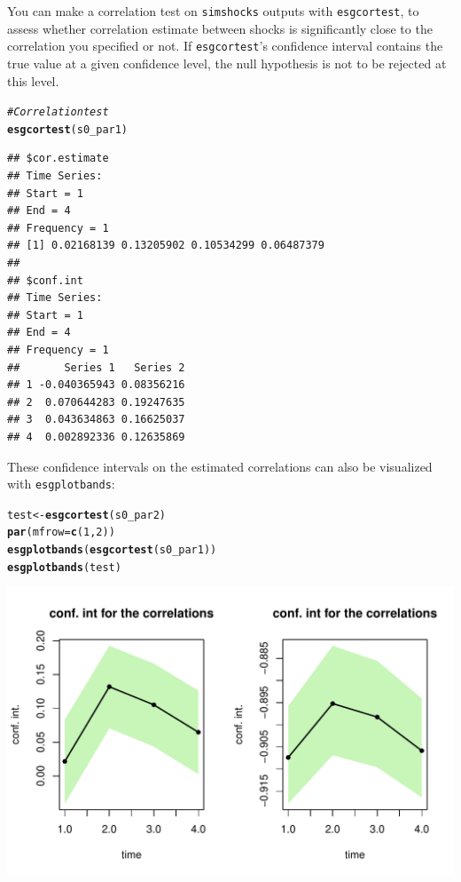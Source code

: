 \documentclass[a4paper]{article}\usepackage[]{graphicx}\usepackage[]{color}
\makeatletter
\def\maxwidth{ %
  \ifdim\Gin@nat@width>\linewidth
    \linewidth
  \else
    \Gin@nat@width
  \fi
}
\newcommand{\hlnum}[1]{\textcolor[rgb]{0.686,0.059,0.569}{#1}}%
\newcommand{\hlcom}[1]{\textcolor[rgb]{0.678,0.584,0.686}{\textit{#1}}}%
\newcommand{\hlstd}[1]{\textcolor[rgb]{0.345,0.345,0.345}{#1}}%
\newcommand{\hlkwb}[1]{\textcolor[rgb]{0.69,0.353,0.396}{#1}}%
\newcommand{\hlkwc}[1]{\textcolor[rgb]{0.333,0.667,0.333}{#1}}%
\newcommand{\hlkwd}[1]{\textcolor[rgb]{0.737,0.353,0.396}{\textbf{#1}}}%
\newenvironment{kframe}{%
 \def\at@end@of@kframe{}%
 \ifinner\ifhmode%
  \def\at@end@of@kframe{\end{minipage}}%
  \begin{minipage}{\columnwidth}%
 \fi\fi%
 \def\FrameCommand##1{\hskip\@totalleftmargin \hskip-\fboxsep
 \colorbox{shadecolor}{##1}\hskip-\fboxsep
     \hskip-\linewidth \hskip-\@totalleftmargin \hskip\columnwidth}%
 \MakeFramed {\advance\hsize-\width
   \@totalleftmargin\z@ \linewidth\hsize
   \@setminipage}}%
 {\par\unskip\endMakeFramed%
 \at@end@of@kframe}
\newenvironment{knitrout}{}{} %
\newcommand{\code}[1]{\mbox{\texttt{#1}}}
\makeatother
\begin{document}
You can make a correlation test on \code{simshocks} outputs with \code{esgcortest}, to assess whether correlation estimate between shocks is significantly close to the correlation you specified or not. If \code{esgcortest}'s confidence interval contains the true value at a given confidence level, the null hypothesis is not to be rejected at this level. 


\begin{knitrout}
\color{fgcolor}\begin{kframe}
\begin{alltt}
\hlcom{# Correlation test}
\hlkwd{esgcortest}\hlstd{(s0_par1)}
\end{alltt}
\begin{verbatim}
## $cor.estimate
## Time Series:
## Start = 1 
## End = 4 
## Frequency = 1 
## [1] 0.02168139 0.13205902 0.10534299 0.06487379
## 
## $conf.int
## Time Series:
## Start = 1 
## End = 4 
## Frequency = 1 
##       Series 1   Series 2
## 1 -0.040365943 0.08356216
## 2  0.070644283 0.19247635
## 3  0.043634863 0.16625037
## 4  0.002892336 0.12635869
\end{verbatim}
\end{kframe}
\end{knitrout}

These confidence intervals on the estimated correlations can also be visualized with \code{esgplotbands}:  

\begin{knitrout}
\color{fgcolor}\begin{kframe}
\begin{alltt}
\hlstd{test} \hlkwb{<-} \hlkwd{esgcortest}\hlstd{(s0_par2)}
\hlkwd{par}\hlstd{(}\hlkwc{mfrow}\hlstd{=}\hlkwd{c}\hlstd{(}\hlnum{1}\hlstd{,} \hlnum{2}\hlstd{))}
\hlkwd{esgplotbands}\hlstd{(}\hlkwd{esgcortest}\hlstd{(s0_par1))}
\hlkwd{esgplotbands}\hlstd{(test)}
\end{alltt}
\end{kframe}

{\centering \includegraphics[width=\maxwidth]{figure/example_simshocks_3-1} 

}



\end{knitrout}
\end{document}
